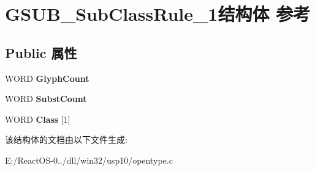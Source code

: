 \hypertarget{struct_g_s_u_b___sub_class_rule__1}{}\section{G\+S\+U\+B\+\_\+\+Sub\+Class\+Rule\+\_\+1结构体 参考}
\label{struct_g_s_u_b___sub_class_rule__1}
\subsection*{Public 属性}
\begin{DoxyCompactItemize}
\item 
\mbox{\label{struct_g_s_u_b___sub_class_rule__1_a30396064eedc4523485dcb7f01c26576}} 
W\+O\+RD {\bfseries Glyph\+Count}
\item 
\mbox{\label{struct_g_s_u_b___sub_class_rule__1_a1fa3a54281d65007f78b555f15356a9a}} 
W\+O\+RD {\bfseries Subst\+Count}
\item 
\mbox{\label{struct_g_s_u_b___sub_class_rule__1_a01de0f84f091c2bd78a59a979090c5d4}} 
W\+O\+RD {\bfseries Class} \mbox{[}1\mbox{]}
\end{DoxyCompactItemize}


该结构体的文档由以下文件生成\+:\begin{DoxyCompactItemize}
\item 
E\+:/\+React\+O\+S-\/0../dll/win32/usp10/opentype.\+c\end{DoxyCompactItemize}

